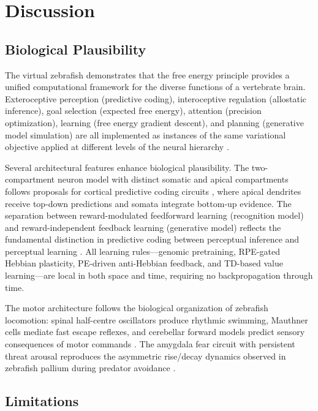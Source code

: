 \documentclass[12pt]{article}
\begin{document}
\section{Discussion}\label{sec:discussion}

\subsection{Biological Plausibility}

The virtual zebrafish demonstrates that the free energy principle
provides a unified computational framework for the diverse functions
of a vertebrate brain.
Exteroceptive perception (predictive coding), interoceptive regulation
(allostatic inference), goal selection (expected free energy), attention
(precision optimization), learning (free energy gradient descent), and
planning (generative model simulation) are all implemented as instances
of the same variational objective applied at different levels of the
neural hierarchy \citep{friston2010,parr2022}.

Several architectural features enhance biological plausibility.
The two-compartment neuron model with distinct somatic and apical
compartments follows proposals for cortical predictive coding circuits
\citep{sacramento2018}, where apical dendrites receive top-down
predictions and somata integrate bottom-up evidence.
The separation between reward-modulated feedforward learning
(recognition model) and reward-independent feedback learning
(generative model) reflects the fundamental distinction in predictive
coding between perceptual inference and perceptual
learning \citep{rao1999,clark2013}.
All learning rules---genomic pretraining, RPE-gated Hebbian plasticity,
PE-driven anti-Hebbian feedback, and TD-based value learning---are
local in both space and time, requiring no backpropagation through time.

The motor architecture follows the biological organization of zebrafish
locomotion: spinal half-centre oscillators produce rhythmic swimming,
Mauthner cells mediate fast escape reflexes, and cerebellar forward
models predict sensory consequences of motor commands
\citep{marques2018,temizer2015}.
The amygdala fear circuit with persistent threat arousal reproduces
the asymmetric rise/decay dynamics observed in zebrafish pallium during
predator avoidance \citep{ahrens2013}.

\subsection{Limitations}
\end{document}
